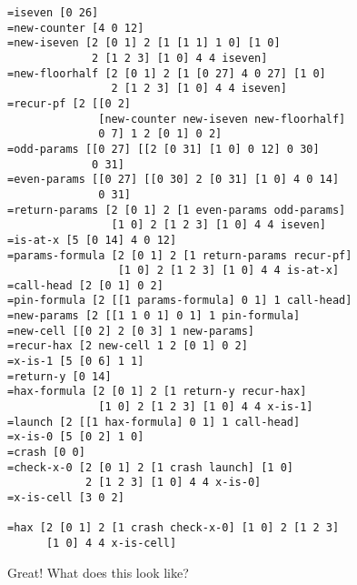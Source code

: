 \documentclass[twoside]{article}
\begin{document}
\begin{lstlisting}[style=listingcode]
=iseven [0 26]
=new-counter [4 0 12]
=new-iseven [2 [0 1] 2 [1 [1 1] 1 0] [1 0]
             2 [1 2 3] [1 0] 4 4 iseven]
=new-floorhalf [2 [0 1] 2 [1 [0 27] 4 0 27] [1 0]
                2 [1 2 3] [1 0] 4 4 iseven]
=recur-pf [2 [[0 2]
              [new-counter new-iseven new-floorhalf]
              0 7] 1 2 [0 1] 0 2] 
=odd-params [[0 27] [[2 [0 31] [1 0] 0 12] 0 30]
             0 31]
=even-params [[0 27] [[0 30] 2 [0 31] [1 0] 4 0 14]
              0 31]
=return-params [2 [0 1] 2 [1 even-params odd-params]
                [1 0] 2 [1 2 3] [1 0] 4 4 iseven]
=is-at-x [5 [0 14] 4 0 12]
=params-formula [2 [0 1] 2 [1 return-params recur-pf]
                 [1 0] 2 [1 2 3] [1 0] 4 4 is-at-x]
=call-head [2 [0 1] 0 2]
=pin-formula [2 [[1 params-formula] 0 1] 1 call-head]
=new-params [2 [[1 1 0 1] 0 1] 1 pin-formula]
=new-cell [[0 2] 2 [0 3] 1 new-params]
=recur-hax [2 new-cell 1 2 [0 1] 0 2]
=x-is-1 [5 [0 6] 1 1]
=return-y [0 14]
=hax-formula [2 [0 1] 2 [1 return-y recur-hax]
              [1 0] 2 [1 2 3] [1 0] 4 4 x-is-1]
=launch [2 [[1 hax-formula] 0 1] 1 call-head]
=x-is-0 [5 [0 2] 1 0]
=crash [0 0]
=check-x-0 [2 [0 1] 2 [1 crash launch] [1 0]
            2 [1 2 3] [1 0] 4 4 x-is-0]
=x-is-cell [3 0 2]

=hax [2 [0 1] 2 [1 crash check-x-0] [1 0] 2 [1 2 3]
      [1 0] 4 4 x-is-cell]
\end{lstlisting}

\noindent
Great! What does this look like?
\end{document}
